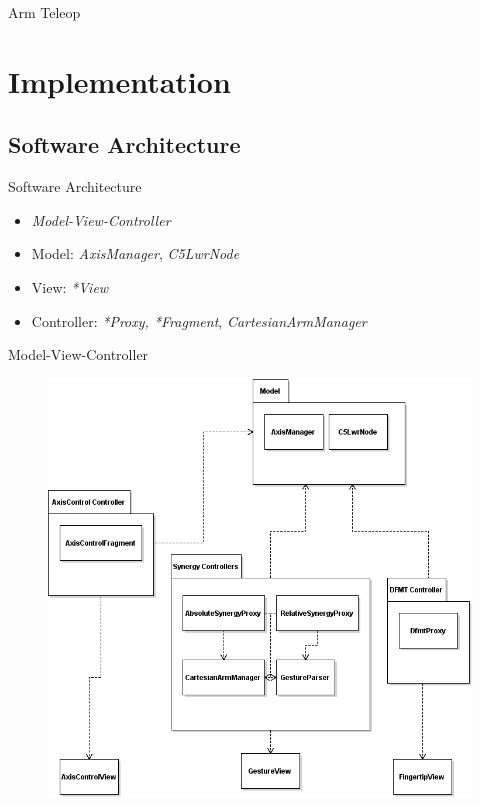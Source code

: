 \documentclass[t]{beamer}
\begin{document}
\begin{frame}{Arm Teleop}
\begin{figure}
\end{figure}
\end{frame}

\section{Implementation}
\subsection{Software Architecture}

\begin{frame}{Software Architecture}
\begin{itemize}
	\item \textit{Model-View-Controller} \cite{Eilebrecht2013}
	\item Model: \textit{AxisManager}, \textit{C5LwrNode}
	\item View: \textit{*View}
	\item Controller: \textit{*Proxy, *Fragment}, \textit{CartesianArmManager}
\end{itemize}
\end{frame}

\begin{frame}{Model-View-Controller}
\begin{figure}
	\includegraphics[width=0.6\linewidth]{assets/chpt_concepts/sw/mvc}
\end{figure}
\end{frame}
\end{document}
